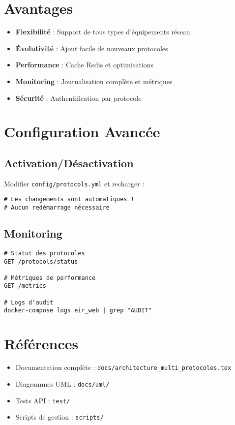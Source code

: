 \documentclass[11pt]{article}
\begin{document}
\section{Avantages}

\begin{itemize}
    \item \textbf{Flexibilité} : Support de tous types d'équipements réseau
    \item \textbf{Évolutivité} : Ajout facile de nouveaux protocoles
    \item \textbf{Performance} : Cache Redis et optimisations
    \item \textbf{Monitoring} : Journalisation complète et métriques
    \item \textbf{Sécurité} : Authentification par protocole
\end{itemize}

\section{Configuration Avancée}

\subsection{Activation/Désactivation}
Modifier \texttt{config/protocols.yml} et recharger :
\begin{lstlisting}
# Les changements sont automatiques !
# Aucun redémarrage nécessaire
\end{lstlisting}

\subsection{Monitoring}
\begin{lstlisting}
# Statut des protocoles
GET /protocols/status

# Métriques de performance  
GET /metrics

# Logs d'audit
docker-compose logs eir_web | grep "AUDIT"
\end{lstlisting}

\section{Références}

\begin{itemize}
    \item Documentation complète : \texttt{docs/architecture\_multi\_protocoles.tex}
    \item Diagrammes UML : \texttt{docs/uml/}
    \item Tests API : \texttt{test/}
    \item Scripts de gestion : \texttt{scripts/}
\end{itemize}
\end{document}
